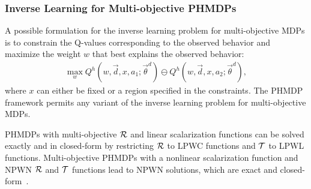 
\subsubsection{Inverse Learning for Multi-objective PHMDPs}

A possible formulation for the inverse learning problem for multi-objective MDPs is to 
constrain the Q-values corresponding to the observed behavior and maximize the weight {\footnotesize $ w $} that best explains the observed behavior: 
\begin{align}
    \max_w Q^{h} \left(w, \vec{d}, x, a_1; \vec{\theta}^d \right) \ominus Q^{h} \left(w, \vec{d}, x, a_2; \vec{\theta}^d \right),
\end{align}
where {\footnotesize $ x $} can either be fixed or a region specified in the constraints. The PHMDP framework permits any variant of the inverse learning problem for multi-objective MDPs.

PHMDPs with multi-objective {\footnotesize $\mathcal{R}$} and linear scalarization functions can be solved exactly and in closed-form by restricting {\footnotesize $\mathcal{R}$} to LPWC functions and {\footnotesize $\mathcal{T}$} to LPWL functions. 
Multi-objective PHMDPs with a nonlinear scalarization function and NPWN {\footnotesize $\mathcal{R}$} and {\footnotesize $\mathcal{T}$} functions lead to NPWN solutions, which are exact and closed-form~\parencite{Sanner_UAI_2011}.

